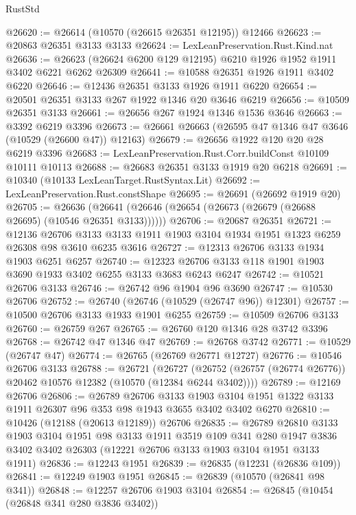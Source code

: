 \begin{lexlean}{RustStd}
\begin{coremodule}
@26620 := @26614 (@10570 (@26615 @26351 @12195)) @12466
@26623 := @20863 @26351 @3133 @3133
@26624 := LexLeanPreservation.Rust.Kind.nat
@26636 := @26623 (@26624 @6200 @129 @12195) @6210 @1926 @1952 @1911 @3402 @6221 @6262 @26309
@26641 := @10588 @26351 @1926 @1911 @3402 @6220
@26646 := @12436 @26351 @3133 @1926 @1911 @6220
@26654 := @20501 @26351 @3133 @267 @1922 @1346 @20 @3646 @6219
@26656 := @10509 @26351 @3133
@26661 := @26656 @267 @1924 @1346 @1536 @3646
@26663 := @3392 @6219 @3396
@26673 := @26661 @26663 (@26595 @47 @1346 @47 @3646 (@10529 (@26600 @47)) @12163)
@26679 := @26656 @1922 @120 @20 @28 @6219 @3396
@26683 := LexLeanPreservation.Rust.Corr.buildConst @10109 @10111 @10113
@26688 := @26683 @26351 @3133 @1919 @20 @6218
@26691 := @10340 (@10133 LexLeanTarget.RustSyntax.Lit)
@26692 := LexLeanPreservation.Rust.constShape
@26695 := @26691 (@26692 @1919 @20)
@26705 := @26636 (@26641 (@26646 (@26654 (@26673 (@26679 (@26688 @26695) (@10546 @26351 @3133))))))
@26706 := @20687 @26351
@26721 := @12136
    @26706
    @3133
    @3133
    @1911
    @1903
    @3104
    @1934
    @1951
    @1323
    @6259
    @26308
    @98
    @3610
    @6235
    @3616
@26727 := @12313 @26706 @3133 @1934 @1903 @6251 @6257
@26740 := @12323 @26706 @3133 @118 @1901 @1903 @3690 @1933 @3402 @6255 @3133 @3683 @6243 @6247
@26742 := @10521 @26706 @3133
@26746 := @26742 @96 @1904 @96 @3690
@26747 := @10530 @26706
@26752 := @26740 (@26746 (@10529 (@26747 @96)) @12301)
@26757 := @10500 @26706 @3133 @1933 @1901 @6255
@26759 := @10509 @26706 @3133
@26760 := @26759 @267
@26765 := @26760 @120 @1346 @28 @3742 @3396
@26768 := @26742 @47 @1346 @47
@26769 := @26768 @3742
@26771 := @10529 (@26747 @47)
@26774 := @26765 (@26769 @26771 @12727)
@26776 := @10546 @26706 @3133
@26788 := @26721
    (@26727 (@26752 (@26757 (@26774 @26776)) @20462 @10576 @12382 (@10570 (@12384 @6244 @3402))))
@26789 := @12169 @26706
@26806 := @26789
    @26706
    @3133
    @1903
    @3104
    @1951
    @1322
    @3133
    @1911
    @26307
    @96
    @353
    @98
    @1943
    @3655
    @3402
    @3402
    @6270
@26810 := @10426 (@12188 (@20613 @12189)) @26706
@26835 := @26789
    @26810
    @3133
    @1903
    @3104
    @1951
    @98
    @3133
    @1911
    @3519
    @109
    @341
    @280
    @1947
    @3836
    @3402
    @3402
    @26303
    (@12221 @26706 @3133 @1903 @3104 @1951 @3133 @1911)
@26836 := @12243 @1951
@26839 := @26835 (@12231 (@26836 @109))
@26841 := @12249 @1903 @1951
@26845 := @26839 (@10570 (@26841 @98 @341))
@26848 := @12257 @26706 @1903 @3104
@26854 := @26845 (@10454 (@26848 @341 @280 @3836 @3402))

\end{coremodule}
\end{lexlean}
